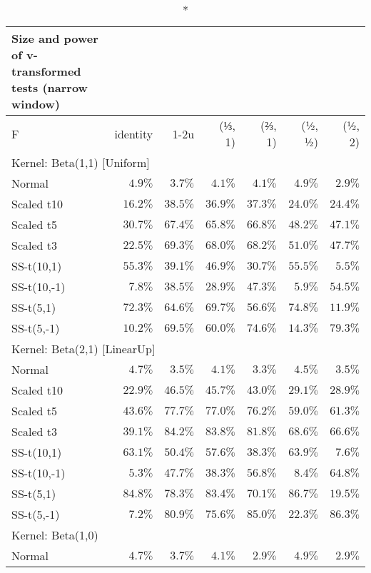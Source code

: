 \setlength{\LTpost}{0mm}
\begin{longtable}{lrrrrrr}
\caption*{
{\large Size and power of v-transformed tests (narrow window)}
} \\ 
\toprule
F & identity & \textbar{}1-2u\textbar{} & (⅓, 1) & (⅔, 1) & (½, ½) & (½, 2) \\ 
\midrule
\multicolumn{7}{l}{Kernel: Beta(1,1) [Uniform]} \\ 
\midrule
Normal & $4.9\%$ & $3.7\%$ & $4.1\%$ & $4.1\%$ & $4.9\%$ & $2.9\%$ \\ 
Scaled t10 & $16.2\%$ & $38.5\%$ & $36.9\%$ & $37.3\%$ & $24.0\%$ & $24.4\%$ \\ 
Scaled t5 & $30.7\%$ & $67.4\%$ & $65.8\%$ & $66.8\%$ & $48.2\%$ & $47.1\%$ \\ 
Scaled t3 & $22.5\%$ & $69.3\%$ & $68.0\%$ & $68.2\%$ & $51.0\%$ & $47.7\%$ \\ 
SS-t(10,1) & $55.3\%$ & $39.1\%$ & $46.9\%$ & $30.7\%$ & $55.5\%$ & $5.5\%$ \\ 
SS-t(10,-1) & $7.8\%$ & $38.5\%$ & $28.9\%$ & $47.3\%$ & $5.9\%$ & $54.5\%$ \\ 
SS-t(5,1) & $72.3\%$ & $64.6\%$ & $69.7\%$ & $56.6\%$ & $74.8\%$ & $11.9\%$ \\ 
SS-t(5,-1) & $10.2\%$ & $69.5\%$ & $60.0\%$ & $74.6\%$ & $14.3\%$ & $79.3\%$ \\ 
\midrule
\multicolumn{7}{l}{Kernel: Beta(2,1) [LinearUp]} \\ 
\midrule
Normal & $4.7\%$ & $3.5\%$ & $4.1\%$ & $3.3\%$ & $4.5\%$ & $3.5\%$ \\ 
Scaled t10 & $22.9\%$ & $46.5\%$ & $45.7\%$ & $43.0\%$ & $29.1\%$ & $28.9\%$ \\ 
Scaled t5 & $43.6\%$ & $77.7\%$ & $77.0\%$ & $76.2\%$ & $59.0\%$ & $61.3\%$ \\ 
Scaled t3 & $39.1\%$ & $84.2\%$ & $83.8\%$ & $81.8\%$ & $68.6\%$ & $66.6\%$ \\ 
SS-t(10,1) & $63.1\%$ & $50.4\%$ & $57.6\%$ & $38.3\%$ & $63.9\%$ & $7.6\%$ \\ 
SS-t(10,-1) & $5.3\%$ & $47.7\%$ & $38.3\%$ & $56.8\%$ & $8.4\%$ & $64.8\%$ \\ 
SS-t(5,1) & $84.8\%$ & $78.3\%$ & $83.4\%$ & $70.1\%$ & $86.7\%$ & $19.5\%$ \\ 
SS-t(5,-1) & $7.2\%$ & $80.9\%$ & $75.6\%$ & $85.0\%$ & $22.3\%$ & $86.3\%$ \\ 
\midrule
\multicolumn{7}{l}{Kernel: Beta(1,0)} \\ 
\midrule
Normal & $4.7\%$ & $3.7\%$ & $4.1\%$ & $2.9\%$ & $4.9\%$ & $2.9\%$ \\ 

\end{longtable}
